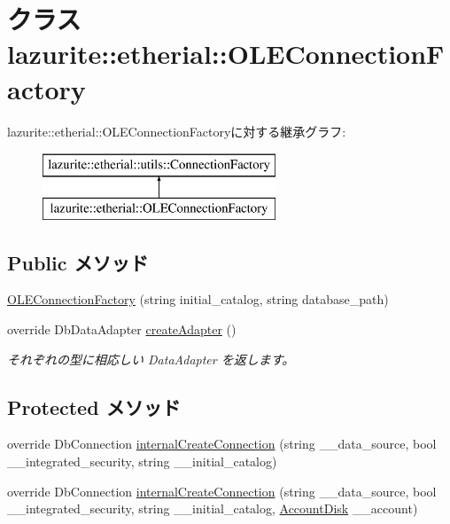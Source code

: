 \hypertarget{classlazurite_1_1etherial_1_1_o_l_e_connection_factory}{
\section{クラス lazurite::etherial::OLEConnectionFactory}
\label{classlazurite_1_1etherial_1_1_o_l_e_connection_factory}
}
lazurite::etherial::OLEConnectionFactoryに対する継承グラフ:\begin{figure}[H]
\begin{center}
\leavevmode
\includegraphics[height=2cm]{classlazurite_1_1etherial_1_1_o_l_e_connection_factory}
\end{center}
\end{figure}
\subsection*{Public メソッド}
\begin{DoxyCompactItemize}
\item 
\hyperlink{classlazurite_1_1etherial_1_1_o_l_e_connection_factory_a6b0b792196721a06b29a3a7b656e211e}{OLEConnectionFactory} (string initial\_\-catalog, string database\_\-path)
\item 
override DbDataAdapter \hyperlink{classlazurite_1_1etherial_1_1_o_l_e_connection_factory_a75b252525f953d501a826d3bb242c69c}{createAdapter} ()
\begin{DoxyCompactList}\small\item\em それぞれの型に相応しい DataAdapter を返します。 \item\end{DoxyCompactList}\end{DoxyCompactItemize}
\subsection*{Protected メソッド}
\begin{DoxyCompactItemize}
\item 
override DbConnection \hyperlink{classlazurite_1_1etherial_1_1_o_l_e_connection_factory_a9c06016911fd6228fa86d6d458a82445}{internalCreateConnection} (string \_\-\_\-data\_\-source, bool \_\-\_\-integrated\_\-security, string \_\-\_\-initial\_\-catalog)
\item 
override DbConnection \hyperlink{classlazurite_1_1etherial_1_1_o_l_e_connection_factory_aa149a9d42af61c87fd73c516bbe43384}{internalCreateConnection} (string \_\-\_\-data\_\-source, bool \_\-\_\-integrated\_\-security, string \_\-\_\-initial\_\-catalog, \hyperlink{classlazurite_1_1etherial_1_1utils_1_1_connection_factory_1_1_account_disk}{AccountDisk} \_\-\_\-account)
\end{DoxyCompactItemize}



